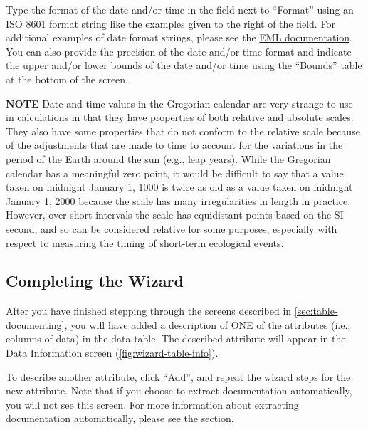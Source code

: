 Type the format of the date and/or time in the field next to ``Format''
using an ISO 8601  format string like the examples given to the right of
the field. For additional examples of date format strings, please see
the \href{http://knb.ecoinformatics.org/software/eml/eml-2.1.1/eml-coverage.html}
{EML documentation}. You can also provide the precision of the date
and/or time format and indicate the upper and/or lower bounds of the
date and/or time using the ``Bounds'' table at the bottom of the screen. 

\begin{shaded}
  \textbf{NOTE} Date and time values in the Gregorian calendar are very
  strange to use in calculations in that they have properties of both
  relative and absolute scales. They also have some properties that do
  not conform to the relative scale because of the adjustments that are
  made to time to account for the variations in the period of the Earth
  around the sun (e.g., leap years). While the Gregorian calendar has a
  meaningful zero point, it would be difficult to say that a value taken
  on midnight January 1, 1000 is twice as old as a value taken on
  midnight January 1, 2000 because the scale has many irregularities in
  length in practice. However, over short intervals the scale has
  equidistant points based on the SI second, and so can be considered
  relative for some purposes, especially with respect to measuring the
  timing of short-term ecological events.
\end{shaded}

\subsection{Completing the Wizard} \label{sec:table-completing}

After you have finished stepping through the screens described in
\autoref{sec:table-documenting}, you will have added a description of
ONE of the attributes (i.e., columns of data) in the data table. The
described attribute will appear in the Data Information screen
(\autoref{fig:wizard-table-info}). 

To describe another attribute, click ``Add'', and repeat the wizard steps
for the new attribute. Note that if you choose to extract documentation
automatically, you will not see this screen. For more information about
extracting documentation automatically, please see the
 section.

